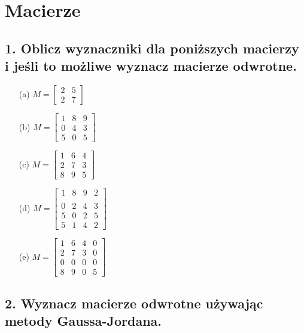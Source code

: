 \section{Macierze}


\subsection*{1. Oblicz wyznaczniki dla poniższych macierzy i jeśli to możliwe wyznacz macierze odwrotne.}

\begin{enumerate}
    \item[(a)] \( M = \begin{bmatrix} 2 & 5 \\ 2 & 7 \end{bmatrix} \)
    
    \item[(b)] \( M = \begin{bmatrix} 1 & 8 & 9 \\ 0 & 4 & 3 \\ 5 & 0 & 5 \end{bmatrix} \)
    
    \item[(c)] \( M = \begin{bmatrix} 1 & 6 & 4 \\ 2 & 7 & 3 \\ 8 & 9 & 5  \end{bmatrix} \)
    
    \item[(d)] \( M = \begin{bmatrix} 1 & 8 & 9 & 2 \\ \\ 0 & 2 & 4 & 3 \\ 5 & 0 & 2 & 5 \\ 5 & 1 & 4 & 2 \end{bmatrix} \)
    
    \item[(e)] \( M = \begin{bmatrix} 1 & 6 & 4 & 0 \\ 2 & 7 & 3 & 0 \\ 0 & 0 & 0 & 0 \\ 8 & 9 & 0 & 5 \end{bmatrix} \)
\end{enumerate}

\subsection*{2. Wyznacz macierze odwrotne używając metody Gaussa-Jordana.}

